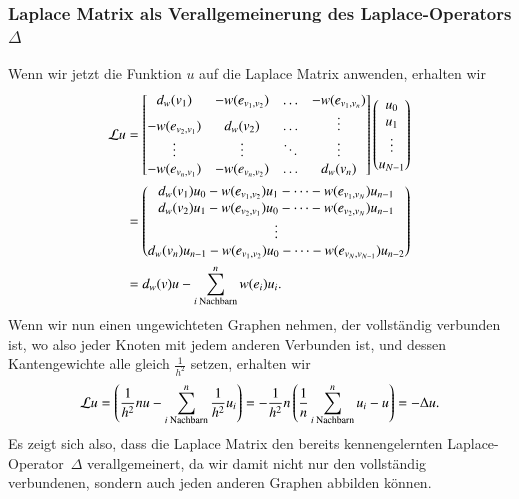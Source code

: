 \subsubsection{Laplace Matrix \texorpdfstring{\laplaceL{}}{L} als 
Verallgemeinerung des Laplace-Operators \texorpdfstring{$\Delta$}{Delta}}

Wenn wir jetzt die Funktion $u$ auf die Laplace Matrix \laplaceL{} anwenden,
erhalten wir
\begin{align*}
\laplaceL u &=
\begin{bmatrix}
d_w(v_1) & -w(e_{v_1, v_2}) & \dotso & -w(e_{v_1, v_n}) \\
-w(e_{v_2, v_1}) & d_w(v_2) & \dotso & \vdots \\
\vdots & \vdots & \ddots &  \vdots \\
-w(e_{v_n, v_1}) & -w(e_{v_n, v_2}) & \dotso & d_w(v_n)
\end{bmatrix}
\begin{pmatrix}
u_0 \\
u_1 \\
\vdots \\
u_{N-1}
\end{pmatrix}\\
&=
\begin{pmatrix}
d_w(v_1)u_0 - w(e_{v_1, v_2}) u_1 - \dotsm -w(e_{v_1, v_N}) u_{n-1} \\
d_w(v_2)u_1 - w(e_{v_2, v_1}) u_0 - \dotsm -w(e_{v_2, v_N}) u_{n-1} \\
\vdots \\
d_w(v_n)u_{n-1} - w(e_{v_1, v_2}) u_0 - \dotsm -w(e_{v_N, v_{N-1}}) u_{n-2} \\
\end{pmatrix}\\
&=
d_w(v)u-\sum_{i\text{ Nachbarn}}^{n} w(e_i)u_i
.
\end{align*}
Wenn wir nun einen ungewichteten Graphen nehmen, der vollst\"andig verbunden 
ist, wo also jeder Knoten mit jedem anderen Verbunden ist, und dessen 
Kantengewichte alle gleich $\frac{1}{h^2}$ setzen, erhalten wir
\begin{equation*}
\laplaceL u =
\left(
    \frac{1}{h^2} n u - \sum_{i\text{ Nachbarn}}^{n} \frac{1}{h^2} u_i
\right)
=
-\frac{1}{h^2} n \left(
    \frac{1}{n}\sum_{i\text{ Nachbarn}}^{n} u_i - u
\right)
= -\Delta u.
\end{equation*}
Es zeigt sich also, dass die Laplace Matrix \laplaceL{} den bereits 
kennengelernten Laplace-Operator~$\Delta$ verallgemeinert, da wir damit nicht 
nur den vollst\"andig verbundenen, sondern auch jeden anderen Graphen abbilden 
k\"onnen.
